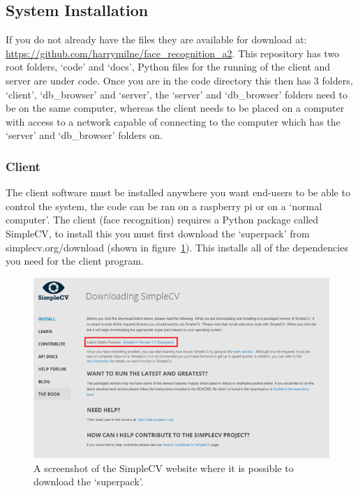 \documentclass[a4paper]{article}
\begin{document}
    \subsection{System Installation}
        If you do not already have the files they are available for download at: \url{https://github.com/harrymilne/face_recognition_a2}.
        This repository has two root folders, `code' and `docs', Python files for the running of the client and server are under code.
        Once you are in the code directory this then has 3 folders, `client', `db\_browser' and `server', the `server' and `db\_browser'
        folders need to be on the same computer, whereas the client needs to be placed on a computer with access to a network capable of
        connecting to the computer which has the `server' and `db\_browser' folders on. 

    \subsubsection{Client}
        The client software must be installed anywhere you want end-users to be able to control the system, the code can be ran on a 
        raspberry pi or on a `normal computer'. 
        The client (face recognition) requires a Python package called SimpleCV, to install this you must first 
        download the `superpack' from simplecv.org/download (shown in figure~\ref{fig:simplecv}).  This installs all of the dependencies 
        you need for the client program.

        \begin{figure}[H]
            \centering
            \caption{A screenshot of the SimpleCV website where it is possible to download the `superpack'.}
            \label{fig:simplecv}
                \includegraphics[scale=0.7]{../shared_assets/screenshots/manual/simplecv_download.png}
        \end{figure}
\end{document}
